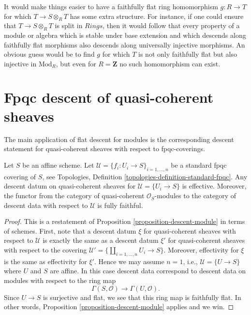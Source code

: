 \begin{remark}
\label{remark-when-locally-split}
It would make things easier to have a faithfully
flat ring homomorphism $g: R \to T$ for which $T \to S \otimes_R T$ has some 
extra structure.
For instance, if one could ensure that $T \to S \otimes_R T$ is split in 
$\textit{Rings}$,
then it would follow that every property of a module or algebra which is stable 
under base extension
and which descends along faithfully flat morphisms also descends along 
universally injective morphisms.
An obvious guess would be to find $g$ for which $T$ is not only faithfully flat 
but also injective in $\text{Mod}_R$,
but even for $R = \mathbf{Z}$ no such homomorphism can exist.
\end{remark}
















\section{Fpqc descent of quasi-coherent sheaves}
\label{section-fpqc-descent-quasi-coherent}

\noindent
The main application of flat descent for modules is
the corresponding descent statement for quasi-coherent
sheaves with respect to fpqc-coverings.

\begin{lemma}
\label{lemma-standard-fpqc-covering}
Let $S$ be an affine scheme.
Let $\mathcal{U} = \{f_i : U_i \to S\}_{i = 1, \ldots, n}$
be a standard fpqc covering of $S$, see
Topologies, Definition \ref{topologies-definition-standard-fpqc}.
Any descent datum on quasi-coherent sheaves
for $\mathcal{U} = \{U_i \to S\}$ is effective.
Moreover, the functor from the category of
quasi-coherent $\mathcal{O}_S$-modules to the category
of descent data with respect to $\mathcal{U}$ is fully faithful.
\end{lemma}

\begin{proof}
This is a restatement of Proposition \ref{proposition-descent-module}
in terms of schemes. First, note that a descent datum $\xi$
for quasi-coherent sheaves with respect to $\mathcal{U}$
is exactly the same as a descent datum $\xi'$ for quasi-coherent sheaves
with respect to the covering
$\mathcal{U}' = \{\coprod_{i = 1, \ldots, n} U_i \to S\}$.
Moreover, effectivity for $\xi$ is the same as effectivity for $\xi'$.
Hence we may assume $n = 1$, i.e., $\mathcal{U} = \{U \to S\}$
where $U$ and $S$ are affine. In this case descent data
correspond to descent data on modules with respect to the ring map
$$
\Gamma(S, \mathcal{O})
\longrightarrow
\Gamma(U, \mathcal{O}).
$$
Since $U \to S$ is surjective and flat, we see that this ring map
is faithfully flat. In other words,
Proposition \ref{proposition-descent-module} applies and we win.
\end{proof}


